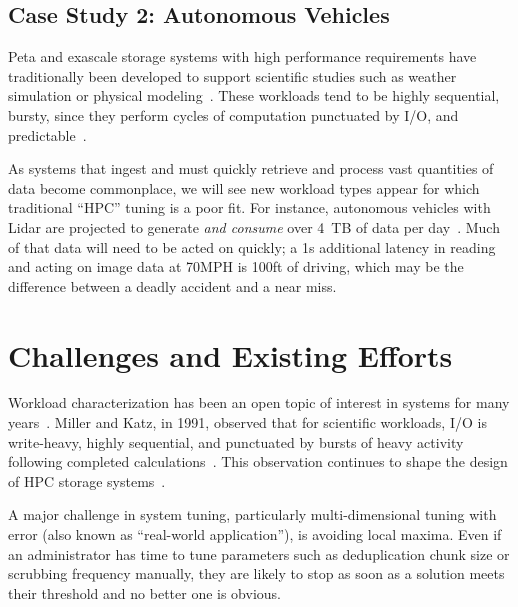 \subsection{Case Study 2: Autonomous Vehicles}
Peta and exascale storage systems with high performance requirements have
traditionally been developed to support scientific studies such as weather
simulation or physical modeling~\cite{miyoshi2016big,maeno2014evolution}.  These workloads tend to be highly
sequential, bursty, since they perform cycles of computation punctuated by I/O,
and predictable~\cite{liufast14}.  

As systems that ingest and must quickly retrieve and process vast quantities of
data become commonplace, we will see new workload types appear for which traditional
``HPC'' tuning is a poor fit.  For instance, autonomous vehicles with Lidar
are projected to generate \textit{and consume} over 4~TB of data per
day~\cite{selfdrivingcars}.  Much of that data will need to be acted on quickly; a 1s
additional latency in reading and acting on image data at 70MPH is 100ft of driving, which may be the difference
between a deadly accident and a near miss. 
%


\section{Challenges and Existing Efforts}%
\label{sec:challenges}

Workload characterization has been an open topic of interest in systems for many
years~\cite{ganger1995generating,wang2004storage,tarasov2012extracting}.  Miller
and Katz, in 1991, observed that for scientific workloads, I/O is write-heavy,
highly sequential, and punctuated by bursts of heavy activity following
completed calculations~\cite{millersc91,gunaskaramcaches11,rothpdsw07}.  This
observation continues to shape the design of HPC storage
systems~\cite{gunaskaramcaches11}.

A major challenge in system tuning, particularly multi-dimensional tuning with
error (also known as ``real-world application''), is avoiding local maxima.
Even if an administrator has time to tune parameters such as deduplication chunk
size or scrubbing frequency manually, they are likely to stop as soon as a
solution meets their threshold and no better one is obvious.%

